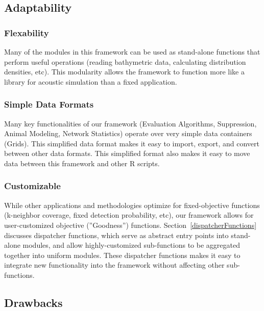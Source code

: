 \subsection{Adaptability}
\subsubsection{Flexability}
Many of the modules in this framework can be used as stand-alone functions that perform useful operations (reading bathymetric data, calculating distribution densities, etc).  This modularity allows the framework to function more like a library for acoustic simulation than a fixed application.  

\subsubsection{Simple Data Formats}
Many key functionalities of our framework (Evaluation Algorithms, Suppression, Animal Modeling, Network Statistics) operate over very simple data containers (Grids).   This simplified data format makes it easy to import, export, and convert between other data formats.  This simplified format also makes it easy to move data between this framework and other R scripts.

\subsubsection{Customizable}
While other applications and methodologies optimize for fixed-objective functions (k-neighbor coverage, fixed detection probability, etc), our framework allows for user-customized objective (''Goodness'') functions.  Section~\ref{dispatcherFunctions} discusses dispatcher functions, which serve as abstract entry points into stand-alone modules, and allow highly-customized sub-functions to be aggregated together into uniform modules.  These dispatcher functions makes it easy to integrate new functionality into the framework without affecting other sub-functions.  

\subsection{Drawbacks}
